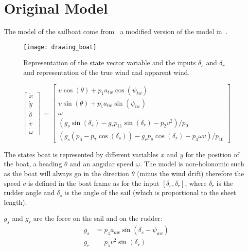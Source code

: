 \section{Original Model}

The model of the sailboat come from~\cite{Melin2016} a modified version of the model in~\cite{LeBars2013}.


\begin{figure}[H]
\centering
    \texttt{[image: drawing\_boat]}
    \caption{Representation of the state vector variable and the inputs $\delta_s$ and $\delta_r$ and representation of the true wind and apparent wind.}
    \label{fig:drawing_boat_ink}
\end{figure}



\begin{equation}
\begin{bmatrix}
\dot{x}\\
\dot{y}\\
\dot{\theta}\\
\dot{v}\\
\dot{\omega}
\end{bmatrix}\  = \begin{bmatrix}
v \cos(\theta)+p_1 a_{tw} \cos(\psi_{tw})\\
v \sin(\theta)+p_1 a_{tw} \sin(\psi_{tw})\\
\omega\\
(g_s \sin(\delta_s)-g_r p_{11} \sin(\delta_r) - p_2 v^2)/p_9\\
(g_s(p_6-p_7\cos(\delta_s))-g_r p_8 \cos(\delta_r)-p_3 \omega v)/p_{10}
\end{bmatrix}
\end{equation}


The states boat is represented by different variables $x$ and $y$ for the position of the boat, a heading $\theta$ 
and an angular speed $\omega$.
The model is non-holonomic such as the boat will always go in the direction $\theta$ (minus the wind drift) therefore the speed $v$ is defined in the boat frame as for the input $[ \delta_s , \delta_r]$, where $\delta_r$ is the rudder angle and $\delta_s$ is the angle of the sail (which is proportional to the sheet length).


$g_s$ and $g_r$ are the force on the sail and on the rudder:
\begin{align}
g_s &= p_4 a_{aw} \sin(\delta_s - \psi_{aw})\\
g_r &= p_5 v^2 \sin(\delta_r)
\end{align}

